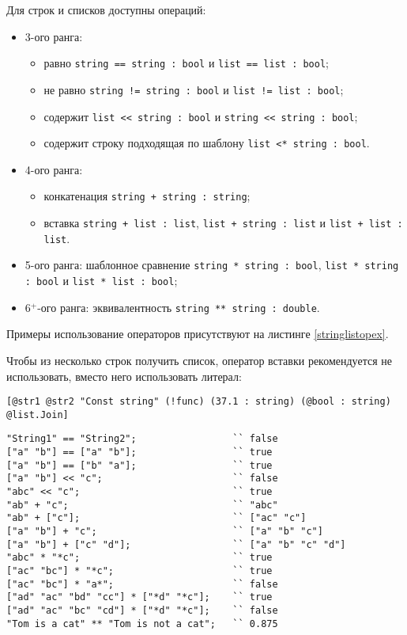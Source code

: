 \documentclass[a4paper, 14pt]{extarticle}
\newenvironment{icItems}
	{ \begin{itemize} [noitemsep,nolistsep] }
	{ \end{itemize} }
\begin{document}
	Для строк и списков доступны операций:
\begin{icItems}
	\item 3-ого ранга:
		\begin{icItems}
		\item равно \lstinline`string == string : bool` и \lstinline`list == list : bool`;
		\item не равно \lstinline`string != string : bool` и \lstinline`list != list : bool`;
		\item содержит \lstinline`list << string : bool` и \lstinline`string << string : bool`;
		\item содержит строку подходящая по шаблону \lstinline`list <* string : bool`.
		\end{icItems}
	\item 4-ого ранга:
		\begin{icItems}
		\item конкатенация \lstinline`string + string : string`;
		\item вставка \lstinline`string + list : list`, \lstinline`list + string : list` и \lstinline`list + list : list`.
		\end{icItems}
	\item 5-ого ранга: шаблонное сравнение \lstinline`string * string : bool`, \lstinline`list * string : bool` и \lstinline`list * list : bool`;
	\item 6$^+$-ого ранга: эквивалентность \lstinline`string ** string : double`.
\end{icItems}

Примеры использование операторов присутствуют на листинге \ref{stringlistopex}.

Чтобы из несколько строк получить список, оператор вставки рекомендуется не использовать, вместо него использовать литерал:
\begin{lstlisting}[numbers=none]
[@str1 @str2 "Const string" (!func) (37.1 : string) (@bool : string) @list.Join]
\end{lstlisting}

\begin{lstlisting}[caption=Примеры использования операторов над данными типа string и list, label=stringlistopex]
"String1" == "String2";					`` false
["a" "b"] == ["a" "b"];					`` true
["a" "b"] == ["b" "a"];					`` true
["a" "b"] << "c";						`` false
"abc" << "c";							`` true
"ab" + "c";								`` "abc"
"ab" + ["c"];							`` ["ac" "c"]
["a" "b"] + "c";						`` ["a" "b" "c"]
["a" "b"] + ["c" "d"];					`` ["a" "b" "c" "d"]
"abc" * "*c";							`` true
["ac" "bc"] * "*c";						`` true
["ac" "bc"] * "a*";						`` false
["ad" "ac" "bd" "cc"] * ["*d" "*c"];	`` true
["ad" "ac" "bc" "cd"] * ["*d" "*c"];	`` false
"Tom is a cat" ** "Tom is not a cat";	`` 0.875
\end{lstlisting}
\end{document}
